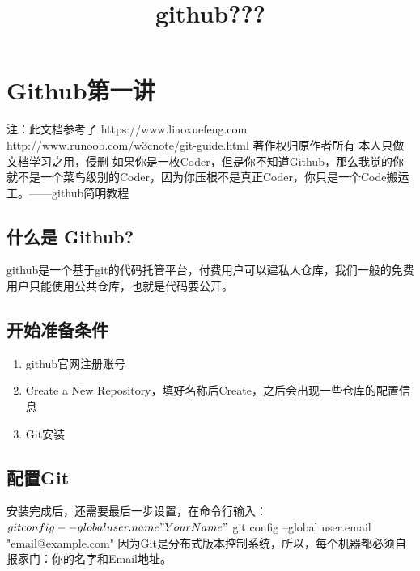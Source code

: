 \documentclass[11pt]{article}
\title{github???}
\providecommand{\tightlist}{%
      \setlength{\itemsep}{0pt}\setlength{\parskip}{0pt}}
\begin{document}
    
    
    \maketitle
    
    

    
    \hypertarget{githubux7b2cux4e00ux8bb2}{%
\section{Github第一讲}\label{githubux7b2cux4e00ux8bb2}}
注：此文档参考了
https://www.liaoxuefeng.com
http://www.runoob.com/w3cnote/git-guide.html
著作权归原作者所有
本人只做文档学习之用，侵删
    如果你是一枚Coder，但是你不知道Github，那么我觉的你就不是一个菜鸟级别的Coder，因为你压根不是真正Coder，你只是一个Code搬运工。------github简明教程

    \hypertarget{ux4ec0ux4e48ux662f-github}{%
\subsection{什么是 Github?}\label{ux4ec0ux4e48ux662f-github}}

    github是一个基于git的代码托管平台，付费用户可以建私人仓库，我们一般的免费用户只能使用公共仓库，也就是代码要公开。

    \hypertarget{ux5f00ux59cbux51c6ux5907ux6761ux4ef6}{%
\subsection{开始准备条件}\label{ux5f00ux59cbux51c6ux5907ux6761ux4ef6}}

    \begin{enumerate}
\def\labelenumi{\arabic{enumi}.}
\tightlist
\item
  github官网注册账号
\item
  Create a New
  Repository，填好名称后Create，之后会出现一些仓库的配置信息
\item
  Git安装
\end{enumerate}

    \hypertarget{ux914dux7f6egit}{%
\subsection{配置Git}\label{ux914dux7f6egit}}

    安装完成后，还需要最后一步设置，在命令行输入：
$ git config --global user.name "Your Name"
$ git config --global user.email "email@example.com"
    因为Git是分布式版本控制系统，所以，每个机器都必须自报家门：你的名字和Email地址。
\end{document}
